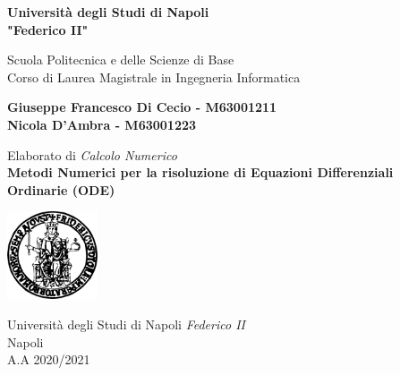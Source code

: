 \begin{titlepage}
	\begin{center}
		\vspace*{1cm}
		
		\Huge
		\textbf{Università degli Studi di Napoli \\ "Federico II"}
		
		\vspace{0.5cm}
		\LARGE
		Scuola Politecnica e delle Scienze di Base\\
		Corso di Laurea Magistrale in Ingegneria Informatica
		
		\vspace{1.5cm}
		
		\textbf{Giuseppe Francesco Di Cecio - M63001211}
		\\
		\textbf{Nicola D'Ambra - M63001223}
		
		\vspace{2cm}
		
		Elaborato di \textit{Calcolo Numerico}
		\\
		\vspace{0.5cm}
		\LARGE
		\textbf{Metodi Numerici per la risoluzione di Equazioni Differenziali Ordinarie (ODE)}
		\vfill
		
		\includegraphics[width=0.2\textwidth]{img/logo.png}
		
		\Large
		Università degli Studi di Napoli \textit{Federico II}\\
		Napoli\\
		A.A 2020/2021
		
	\end{center}
\end{titlepage}